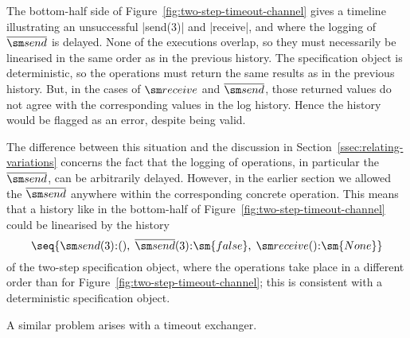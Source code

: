 
The bottom-half side of Figure~\ref{fig:two-step-timeout-channel} gives a
timeline illustrating an unsuccessful |send(3)| and |receive|, and where the
logging of $\overline{\send}$ is delayed.  None of the executions overlap, so
they must necessarily be linearised in the same order as in the previous
history.  The specification object is deterministic, so the operations must
return the same results as in the previous history.  But, in the cases of
$\receive$ and $\overline{\send}$, those returned values do not agree with the
corresponding values in the log history.  Hence the history would be flagged
as an error, despite being valid.

The difference between this situation and the discussion in
Section~\ref{ssec:relating-variations} concerns the fact that the logging of
operations, in particular the $\overline{\send}$, can be arbitrarily delayed.
However, in the earlier section we allowed the $\overline{\send}$ anywhere
within the corresponding concrete operation.  This means that a history like
in the bottom-half of Figure~\ref{fig:two-step-timeout-channel} could be
linearised by the history
\[
\seq{ \send(3)\::(),\; \overline{\send}(3)\::\sm{false},\;
  \receive()\::\sm{None} }
\]
of the two-step specification object, where the operations take place in a
different order than for Figure~\ref{fig:two-step-timeout-channel}; this is
consistent with a deterministic specification object.

A similar problem arises with a timeout exchanger.


